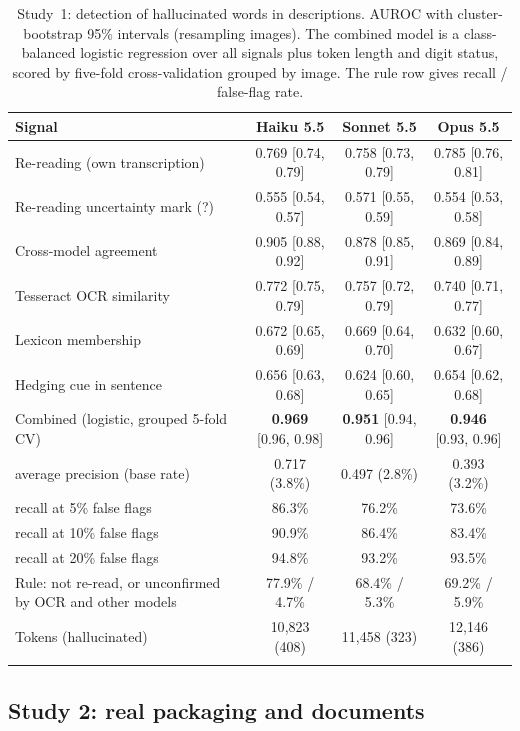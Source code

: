 \documentclass[pdflatex,sn-mathphys-num]{sn-jnl}%
\theoremstyle{thmstyleone}%
\theoremstyle{thmstyletwo}%
\theoremstyle{thmstylethree}%
\begin{document}
\begin{table}[!htbp]
\caption{Study~1: detection of hallucinated words in descriptions. AUROC with cluster-bootstrap 95\% intervals (resampling images). The combined model is a class-balanced logistic regression over all signals plus token length and digit status, scored by five-fold cross-validation grouped by image. The rule row gives recall / false-flag rate.}\label{tab:detect}
\footnotesize
\begin{tabular*}{\textwidth}{@{\extracolsep\fill}lccc}
\toprule
Signal & Haiku 5.5 & Sonnet 5.5 & Opus 5.5 \\
\midrule
Re-reading (own transcription) & 0.769 [0.74, 0.79] & 0.758 [0.73, 0.79] & 0.785 [0.76, 0.81] \\
Re-reading uncertainty mark (?) & 0.555 [0.54, 0.57] & 0.571 [0.55, 0.59] & 0.554 [0.53, 0.58] \\
Cross-model agreement & 0.905 [0.88, 0.92] & 0.878 [0.85, 0.91] & 0.869 [0.84, 0.89] \\
Tesseract OCR similarity & 0.772 [0.75, 0.79] & 0.757 [0.72, 0.79] & 0.740 [0.71, 0.77] \\
Lexicon membership & 0.672 [0.65, 0.69] & 0.669 [0.64, 0.70] & 0.632 [0.60, 0.67] \\
Hedging cue in sentence & 0.656 [0.63, 0.68] & 0.624 [0.60, 0.65] & 0.654 [0.62, 0.68] \\
\midrule
Combined (logistic, grouped 5-fold CV) & \textbf{0.969} [0.96, 0.98] & \textbf{0.951} [0.94, 0.96] & \textbf{0.946} [0.93, 0.96] \\
\quad average precision (base rate) & 0.717 (3.8\%) & 0.497 (2.8\%) & 0.393 (3.2\%) \\
\quad recall at 5\% false flags & 86.3\% & 76.2\% & 73.6\% \\
\quad recall at 10\% false flags & 90.9\% & 86.4\% & 83.4\% \\
\quad recall at 20\% false flags & 94.8\% & 93.2\% & 93.5\% \\
Rule: not re-read, or unconfirmed by OCR and other models & 77.9\% / 4.7\% & 68.4\% / 5.3\% & 69.2\% / 5.9\% \\
Tokens (hallucinated) & 10{,}823 (408) & 11{,}458 (323) & 12{,}146 (386) \\
\botrule
\end{tabular*}
\end{table}

\subsection{Study 2: real packaging and documents}\label{sec:real}
\end{document}
